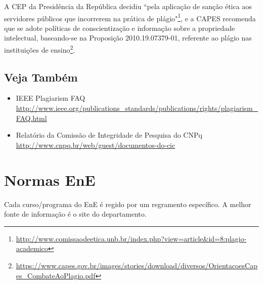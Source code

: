 A \acrfull{CEP} da Presidência da República decidiu  ``pela
aplicação de sanção ética aos servidores públicos que incorrerem na prática de
plágio"\footnote{\url{http://www.comissaodeetica.unb.br/index.php?view=article&id=8:plagio-academico}},
e a \acrfull{CAPES} recomenda que se adote políticas de conscientização e informação
sobre a propriedade intelectual, baseando-se na Proposição 2010.19.07379-01,
referente ao plágio nas instituições de ensino\footnote{\url{https://www.capes.gov.br/images/stories/download/diversos/OrientacoesCapes_CombateAoPlagio.pdf}}.


\subsection{Veja Também}
\begin{itemize}
	\item IEEE Plagiarism FAQ
		\\\url{http://www.ieee.org/publications_standards/publications/rights/plagiarism_FAQ.html}
	\item Relatório da Comissão de Integridade de Pesquisa do CNPq
		\\\url{http://www.cnpq.br/web/guest/documentos-do-cic}
\end{itemize}

\section{Normas EnE}
Cada curso/programa do \acrlong{EnE} é regido por um regramento específico. A melhor fonte de 
informação é o site do departamento.